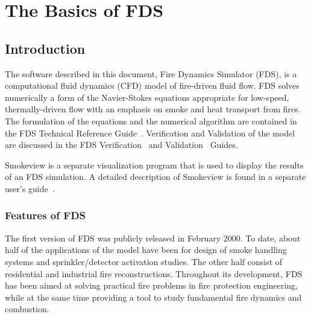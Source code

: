 \documentclass[11pt]{book}
\begin{document}
\cleardoublepage
\listoffigures

\cleardoublepage
\listoftables

\mainmatter



\part{The Basics of FDS}


\chapter{Introduction}

The software described in this document, Fire Dynamics Simulator (FDS), is a computational
fluid dynamics (CFD) model of fire-driven fluid flow. FDS solves numerically a form of the
Navier-Stokes equations appropriate for low-speed, thermally-driven flow
with an emphasis on smoke and heat transport from fires.
The formulation of the equations and the numerical algorithm are contained in the FDS Technical Reference Guide~\cite{FDS_Math_Guide}.
Verification and Validation of the model are discussed in the FDS Verification~\cite{FDS_Verification_Guide} and Validation~\cite{FDS_Validation_Guide} Guides.

Smokeview is a separate visualization program that is used to display the
results of an FDS simulation.
A detailed description of Smokeview is found in
a separate user's guide~\cite{Smokeview_Users_Guide}.


\section{Features of FDS}

The first version of FDS was publicly released in February 2000.
To date, about half of the applications of the model have been for design of smoke
handling systems and sprinkler/detector activation studies. The other half consist of
residential and industrial fire reconstructions. Throughout its development, FDS has
been aimed at solving practical fire problems in fire protection engineering, while
at the same time providing a tool to study fundamental fire dynamics and combustion.
\end{document}
